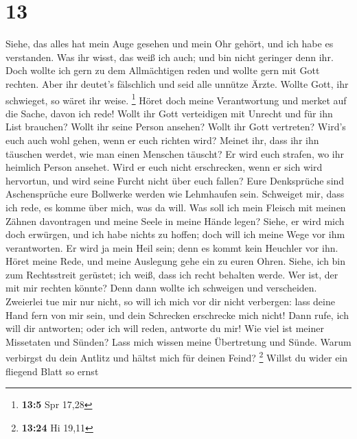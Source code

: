 \hypertarget{section-2}{%
\section{13}\label{section-2}}

 Siehe, das alles hat mein Auge gesehen und mein Ohr
gehört, und ich habe es verstanden.  Was ihr wisst, das
weiß ich auch; und bin nicht geringer denn ihr.  Doch
wollte ich gern zu dem Allmächtigen reden und wollte gern mit Gott
rechten.  Aber ihr deutet's fälschlich und seid alle
unnütze Ärzte.  Wollte Gott, ihr schwieget, so wäret ihr
weise. \footnote{\textbf{13:5} Spr 17,28}  Höret doch
meine Verantwortung und merket auf die Sache, davon ich rede!
 Wollt ihr Gott verteidigen mit Unrecht und für ihn List
brauchen?  Wollt ihr seine Person ansehen? Wollt ihr Gott
vertreten?  Wird's euch auch wohl gehen, wenn er euch
richten wird? Meinet ihr, dass ihr ihn täuschen werdet, wie man einen
Menschen täuscht?  Er wird euch strafen, wo ihr heimlich
Person ansehet.  Wird er euch nicht erschrecken, wenn er
sich wird hervortun, und wird seine Furcht nicht über euch fallen?
 Eure Denksprüche sind Aschensprüche eure Bollwerke
werden wie Lehmhaufen sein.  Schweiget mir, dass ich
rede, es komme über mich, was da will.  Was soll ich mein
Fleisch mit meinen Zähnen davontragen und meine Seele in meine Hände
legen?  Siehe, er wird mich doch erwürgen, und ich habe
nichts zu hoffen; doch will ich meine Wege vor ihm verantworten.
 Er wird ja mein Heil sein; denn es kommt kein Heuchler
vor ihn.  Höret meine Rede, und meine Auslegung gehe ein
zu euren Ohren.  Siehe, ich bin zum Rechtsstreit
gerüstet; ich weiß, dass ich recht behalten werde.  Wer
ist, der mit mir rechten könnte? Denn dann wollte ich schweigen und
verscheiden.  Zweierlei tue mir nur nicht, so will ich
mich vor dir nicht verbergen:  lass deine Hand fern von
mir sein, und dein Schrecken erschrecke mich nicht!  Dann
rufe, ich will dir antworten; oder ich will reden, antworte du mir!
 Wie viel ist meiner Missetaten und Sünden? Lass mich
wissen meine Übertretung und Sünde.  Warum verbirgst du
dein Antlitz und hältst mich für deinen Feind? \footnote{\textbf{13:24}
  Hi 19,11}  Willst du wider ein fliegend Blatt so ernst
